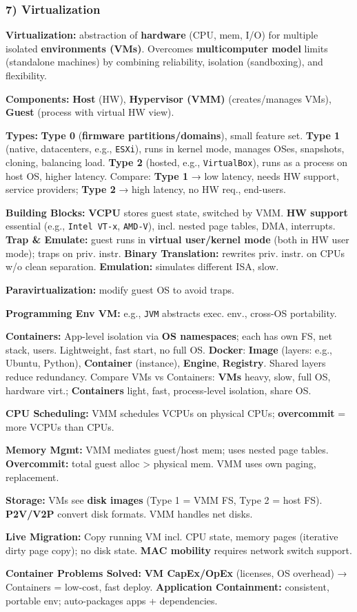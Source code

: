 \subsubsection*{7) Virtualization}
\textbf{Virtualization:} abstraction of \textbf{hardware} (CPU, mem, I/O) for multiple isolated \textbf{environments (VMs)}. Overcomes \textbf{multicomputer model} limits (standalone machines) by combining reliability, isolation (sandboxing), and flexibility.

\textbf{Components:} \textbf{Host} (HW), \textbf{Hypervisor (VMM)} (creates/manages VMs), \textbf{Guest} (process with virtual HW view).

\textbf{Types:} \textbf{Type 0} (\textbf{firmware partitions/domains}), small feature set. \textbf{Type 1} (native, datacenters, e.g., \texttt{ESXi}), runs in kernel mode, manages OSes, snapshots, cloning, balancing load. \textbf{Type 2} (hosted, e.g., \texttt{VirtualBox}), runs as a process on host OS, higher latency. Compare: \textbf{Type 1} → low latency, needs HW support, service providers; \textbf{Type 2} → high latency, no HW req., end-users.

\textbf{Building Blocks:} \textbf{VCPU} stores guest state, switched by VMM. \textbf{HW support} essential (e.g., \texttt{Intel VT-x}, \texttt{AMD-V}), incl. nested page tables, DMA, interrupts. \textbf{Trap \& Emulate:} guest runs in \textbf{virtual user/kernel mode} (both in HW user mode); traps on priv. instr. \textbf{Binary Translation:} rewrites priv. instr. on CPUs w/o clean separation. \textbf{Emulation:} simulates different ISA, slow.

\textbf{Paravirtualization:} modify guest OS to avoid traps.

\textbf{Programming Env VM:} e.g., \texttt{JVM} abstracts exec. env., cross-OS portability.

\textbf{Containers:} App-level isolation via \textbf{OS namespaces}; each has own FS, net stack, users. Lightweight, fast start, no full OS. \textbf{Docker}: \textbf{Image} (layers: e.g., Ubuntu, Python), \textbf{Container} (instance), \textbf{Engine}, \textbf{Registry}. Shared layers reduce redundancy. Compare VMs vs Containers: \textbf{VMs} heavy, slow, full OS, hardware virt.; \textbf{Containers} light, fast, process-level isolation, share OS.

\textbf{CPU Scheduling:} VMM schedules VCPUs on physical CPUs; \textbf{overcommit} = more VCPUs than CPUs.

\textbf{Memory Mgmt:} VMM mediates guest/host mem; uses nested page tables. \textbf{Overcommit:} total guest alloc > physical mem. VMM uses own paging, replacement.

\textbf{Storage:} VMs see \textbf{disk images} (Type 1 = VMM FS, Type 2 = host FS). \textbf{P2V/V2P} convert disk formats. VMM handles net disks.

\textbf{Live Migration:} Copy running VM incl. CPU state, memory pages (iterative dirty page copy); no disk state. \textbf{MAC mobility} requires network switch support.

\textbf{Container Problems Solved:} \textbf{VM CapEx/OpEx} (licenses, OS overhead) → Containers = low-cost, fast deploy. \textbf{Application Containment:} consistent, portable env; auto-packages apps + dependencies.
